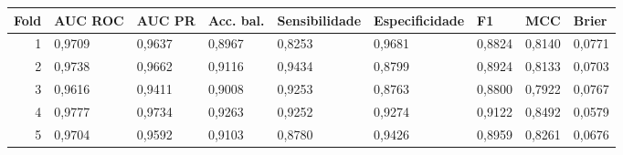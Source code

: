 \begin{tabular}{rllllllll}
\toprule
Fold & AUC ROC & AUC PR & Acc. bal. & Sensibilidade & Especificidade & F1 & MCC & Brier \\
\midrule
1 & 0,9709 & 0,9637 & 0,8967 & 0,8253 & 0,9681 & 0,8824 & 0,8140 & 0,0771 \\
2 & 0,9738 & 0,9662 & 0,9116 & 0,9434 & 0,8799 & 0,8924 & 0,8133 & 0,0703 \\
3 & 0,9616 & 0,9411 & 0,9008 & 0,9253 & 0,8763 & 0,8800 & 0,7922 & 0,0767 \\
4 & 0,9777 & 0,9734 & 0,9263 & 0,9252 & 0,9274 & 0,9122 & 0,8492 & 0,0579 \\
5 & 0,9704 & 0,9592 & 0,9103 & 0,8780 & 0,9426 & 0,8959 & 0,8261 & 0,0676 \\
\bottomrule
\end{tabular}
